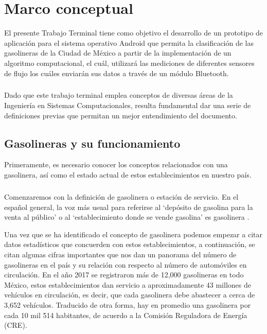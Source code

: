 
\chapter{Marco conceptual}\label{chapter2}
El presente Trabajo Terminal tiene como objetivo el desarrollo de un prototipo de aplicación para el sistema operativo Android que permita la clasificación de las gasolineras de la Ciudad de México a partir de la implementación de un algoritmo computacional, el cuál, utilizará las mediciones de diferentes sensores de flujo los cuáles enviarán sus datos a través de un módulo Bluetooth.
\paragraph{}
Dado que este trabajo terminal emplea conceptos de diversas áreas de la Ingeniería en Sistemas Computacionales, resulta fundamental dar una serie de definiciones previas que permitan un mejor entendimiento del documento.

\section{Gasolineras y su funcionamiento}
Primeramente, es necesario conocer los conceptos relacionados con una gasolinera, así como el estado actual de estos establecimientos en nuestro país.
\paragraph{}
Comenzaremos con la definición de gasolinera o estación de servicio. En el español general, la voz más usual para referirse al ‘depósito de gasolina para la venta al público’ o al ‘establecimiento donde se vende gasolina’ es gasolinera \citep{MarcoTeorico1}. 

Una vez que se ha identificado el concepto de gasolinera podemos empezar a citar datos estadísticos que concuerden con estos establecimientos, a continuación, se citan algunas cifras importantes que nos dan un panorama del número de gasolineras en el país y su relación con respecto al número de automóviles en circulación. En el año 2017 se registraron más de 12,000 gasolineras en todo México, estos establecimientos dan servicio a aproximadamente 43 millones de vehículos en circulación, es decir,  que cada gasolinera debe abastecer a cerca de 3,652 vehículos.  Traducido de otra forma, hay en promedio una gasolinera por cada 10 mil 514 habitantes, de acuerdo a la Comisión Reguladora de Energía (CRE)\citep{MarcoTeorico2}.
